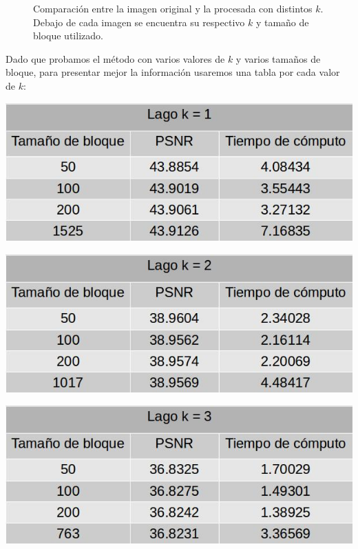 \documentclass[a4paper]{article}
\begin{document}
\begin{figure}[H]
{}
\caption{Comparación entre la imagen original y la procesada con distintos $k$. Debajo de cada imagen se encuentra su respectivo $k$ y tamaño de bloque utilizado.}
\end{figure}
\noindent Dado que probamos el método con varios valores de $k$ y varios tamaños de bloque, para presentar mejor la información usaremos una tabla por cada valor de $k$: 
\newline

\centerline{
\includegraphics[scale=0.5]{imagenes/lagok1Tabla.jpg}
}
\vspace{1cm}

\centerline{
\includegraphics[scale=0.5]{imagenes/lagok2Tabla.jpg}
}
\vspace{1cm}

\centerline{
\includegraphics[scale=0.5]{imagenes/lagok3Tabla.jpg}
}
\vspace{1cm}
\end{document}
